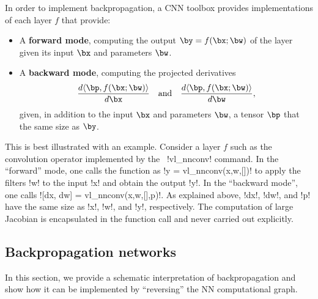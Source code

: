In order to implement backpropagation, a CNN toolbox provides implementations of each layer $f$ that provide:
\begin{itemize}
\item A \textbf{forward mode}, computing the output $\by = f(\bx;\bw)$ of the layer given its input $\bx$ and parameters $\bw$.
\item A \textbf{backward mode}, computing the projected derivatives
\[
\frac{d \langle \bp, f(\bx;\bw) \rangle}
{d \bx}
\quad\text{and}\quad
\frac{d \langle \bp, f(\bx;\bw) \rangle}
{d \bw},
\]
given, in addition to the input $\bx$ and parameters $\bw$, a tensor $\bp$ that the same size as $\by$.
\end{itemize}
This is best illustrated with an example. Consider a layer $f$ such as the convolution operator implemented by the \matconvnet\ !vl_nnconv! command. In the ``forward'' mode, one calls the function as !y = vl_nnconv(x,w,[])! to apply the filters !w! to the input !x! and obtain the output !y!. In the ``backward mode'', one calls ![dx, dw] = vl_nnconv(x,w,[],p)!.  As explained above, !dx!, !dw!, and !p! have the same size as !x!, !w!, and !y!, respectively. The computation of large Jacobian is encapsulated in the function call and never carried out explicitly. 

\subsection{Backpropagation networks}\label{s:bpnets}

In this section, we provide a schematic interpretation of backpropagation and show how it can be implemented by ``reversing'' the NN computational graph.

